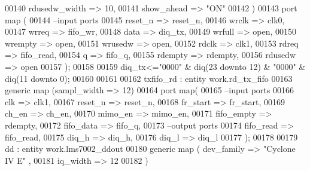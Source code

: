 \begin{DoxyCode}
00140             rdusedw_width   => \textcolor{vhdllogic}{10},
00141             show_ahead      => \textcolor{keyword}{"ON"}
00142   \textcolor{vhdlchar}{)}  
00143   \textcolor{keywordflow}{port} \textcolor{keywordflow}{map} (
00144 \textcolor{keyword}{      --input ports }
00145       reset_n       => reset_n, 
00146       wrclk         => clk0,
00147       wrreq         => fifo_wr,
00148       data          => diq_tx, 
00149       wrfull        => \textcolor{keywordflow}{open},
00150           wrempty            => \textcolor{keywordflow}{open}, 
00151       wrusedw       => \textcolor{keywordflow}{open},
00152       rdclk            => clk1,
00153       rdreq         => fifo_read,
00154       q             => fifo_q,
00155       rdempty       => rdempty,
00156       rdusedw       => \textcolor{keywordflow}{open}    
00157         \textcolor{vhdlchar}{)};
00158         
00159 \textcolor{vhdlchar}{diq_tx}\textcolor{vhdlchar}{<=}\textcolor{vhdllogic}{"0000"} \textcolor{vhdlchar}{&} \textcolor{vhdlchar}{diq}\textcolor{vhdlchar}{(}\textcolor{vhdllogic}{}\textcolor{vhdllogic}{23} \textcolor{keywordflow}{downto} \textcolor{vhdllogic}{}\textcolor{vhdllogic}{12}\textcolor{vhdlchar}{)} \textcolor{vhdlchar}{&} \textcolor{vhdllogic}{"0000"} \textcolor{vhdlchar}{&} \textcolor{vhdlchar}{diq}\textcolor{vhdlchar}{(}\textcolor{vhdllogic}{}\textcolor{vhdllogic}{11} \textcolor{keywordflow}{downto} \textcolor{vhdllogic}{}\textcolor{vhdllogic}{0}\textcolor{vhdlchar}{)};
00160 
00161 
00162 txfifo\_rd : \textcolor{keywordflow}{entity} work.rd_tx_fifo 
00163   \textcolor{keywordflow}{generic} \textcolor{keywordflow}{map} (sampl_width => \textcolor{vhdllogic}{12}\textcolor{vhdlchar}{)}
00164   \textcolor{keywordflow}{port} \textcolor{keywordflow}{map}(
00165 \textcolor{keyword}{        --input ports }
00166       clk              => clk1, 
00167       reset_n     => reset_n,
00168       fr_start    => fr_start,
00169       ch_en             => ch_en, 
00170       mimo_en          => mimo_en, 
00171       fifo_empty     => rdempty,
00172       fifo_data   => fifo_q,
00173 \textcolor{keyword}{        --output ports }
00174       fifo_read   => fifo_read, 
00175       diq_h             => diq_h, 
00176       diq_l             => diq_l
00177         \textcolor{vhdlchar}{)};
00178         
00179 dd : \textcolor{keywordflow}{entity} work.lms7002_ddout 
00180     \textcolor{keywordflow}{generic} \textcolor{keywordflow}{map} ( dev_family    => \textcolor{keyword}{"Cyclone IV E"}  ,
00181                         iq_width        => \textcolor{vhdllogic}{12}
00182     \textcolor{vhdlchar}{)}

\end{DoxyCode}
